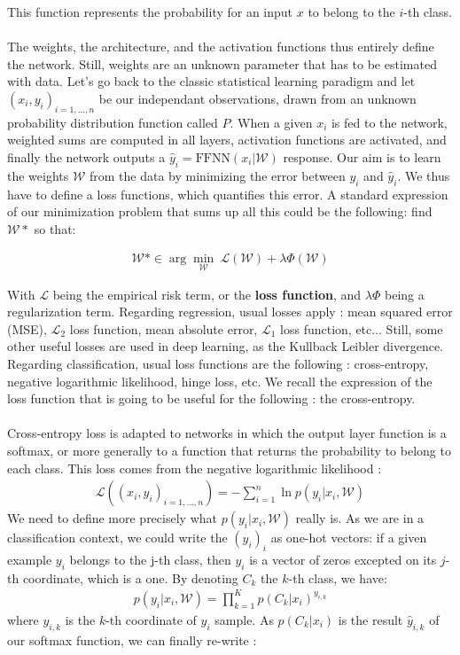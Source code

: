 \documentclass{article}
\begin{document}
\noindent This function represents the probability for an input $x$ to belong to the $i$-th class. \\ \\


The weights, the architecture, and the activation functions thus entirely define the network. Still, 
weights are an unknown parameter that has to be estimated with data. Let's go back to the classic 
statistical learning paradigm and let $(x_i, y_i)_{i=1, ..., n}$ be our independant observations, drawn from an unknown probability distribution function called $P$. 
When a given $x_i$ is fed to the network, weighted sums are computed in all layers, activation
functions are activated, and finally the network outputs a $\hat{y}_i = \text{FFNN}(x_i|\mathcal{W})$ response. 
Our aim is to learn the weights $\mathcal{W}$ from the data by minimizing the error between 
$y_i$ and $\hat{y}_i$. We thus have to define a loss functions, which quantifies this error. 
A standard expression of our minimization problem that sums up all this could be the following: find $\mathcal{W}*$ so that:

\begin{align*}
    \mathcal{W}* \in    \arg \underset{\mathcal{W}}{\min}   \
     \mathcal{L}(\mathcal{W}) + \lambda \Phi(\mathcal{W})
\end{align*}

With $\mathcal{L}$ being the empirical risk term, or the \textbf{loss function}, and $\lambda\Phi$
being a regularization term. 
Regarding regression, usual losses apply : mean squared error (MSE), $\mathcal{L}_2$ loss function, 
mean absolute error, $\mathcal{L}_1$ loss function, etc... Still, some other useful losses are 
used in deep learning, as the Kullback Leibler divergence. Regarding classification, usual loss functions 
are the following : cross-entropy, negative logarithmic likelihood, hinge loss, etc. We recall the expression
of the loss function that is going to be useful for the following : the cross-entropy. \\ \\
Cross-entropy loss is adapted to networks in which the output layer function is a softmax, 
or more generally to a function that returns the probability to belong to each class. This loss
comes from the negative logarithmic likelihood :
\begin{align*}
    \mathcal{L}((x_i, y_i)_{i=1, ..., n}) = -\sum_{i=1}^n \ln p(y_i|x_i, \mathcal{W})
\end{align*}
We need to define more precisely what $p(y_i|x_i, \mathcal{W})$ really is. As we are in a classification
context, we could write the $(y_i)_i$ as one-hot vectors: if a given example $y_i$ belongs to 
the j-th class, then $y_i$ is a vector of zeros excepted on its $j$-th coordinate, which is a one. 
By denoting $C_k$ the $k$-th class, we have:
\begin{align*}
    p(y_i  |x_i, \mathcal{W}) = \prod_{k=1}^K p(C_k|x_i)^{y_{i, k}}
\end{align*}
where $y_{i, k}$ is the $k$-th coordinate of $y_i$ sample. As $p(C_k|x_i)$ is the result $\hat{y}_{i, k}$ of our
softmax function, we can finally re-write :
\end{document}
